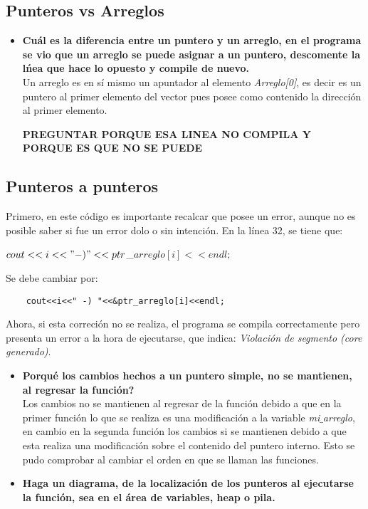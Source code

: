 \documentclass{article}
\begin{document}
\subsection{Punteros vs Arreglos}
\begin{itemize}
\item \textbf{Cu\' al es la diferencia entre un puntero y un arreglo, en el programa se vio que un arreglo se puede asignar
a un puntero, descomente la l\' nea que hace lo opuesto y compile de nuevo.}\\

Un arreglo es  en s\' i mismo un apuntador al elemento \textit{Arreglo[0]}, es decir es un puntero al primer elemento del vector pues posee como contenido la direcci\' on al primer elemento.


\textbf{PREGUNTAR PORQUE ESA LINEA NO COMPILA Y PORQUE ES QUE NO SE PUEDE}
\end{itemize}

\subsection{Punteros a punteros}
Primero, en este c\' odigo es importante recalcar que posee un error, aunque no es posible saber si fue un error dolo o sin intenci\' on. En la l\' inea 32, se tiene que:

\begin{listing}
$cout<<i<<" -) "<<ptr$\_$arreglo[i]<<endl;$
\end{listing}

Se debe cambiar por:
\begin{verbatim}
	cout<<i<<" -) "<<&ptr_arreglo[i]<<endl;
\end{verbatim}
Ahora, si esta correci\' on no se realiza, el programa se compila correctamente pero presenta un error a la hora de ejecutarse, que indica: \textit{Violaci\' on de segmento (core generado)}.

\begin{itemize}
\item \textbf{Porqu\' e los cambios hechos a un puntero simple, no se mantienen, al regresar la funci\' on?}\\

Los cambios no se mantienen al regresar de la funci\' on debido a que en la primer funci\' on lo que se realiza es una modificaci\' on a la variable \textit{mi$\_$arreglo}, en cambio en la segunda funci\' on los cambios si se mantienen debido a que esta realiza una modificaci\' on sobre el contenido del puntero interno. Esto se pudo comprobar al cambiar el orden en que se llaman las funciones.

\item \textbf{Haga un diagrama, de la localizaci\' on de los punteros al ejecutarse la funci\' on, sea en el \' area de variables,
heap o pila.}

\end{itemize}
\end{document}
